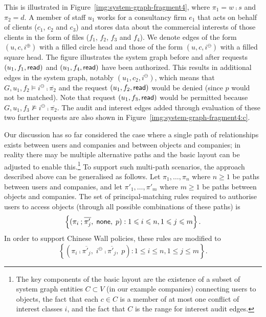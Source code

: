 \documentclass{article}
\newcommand{\set}[1]{\ensuremath{\left\{#1\right\}}} \newcommand{\setO}[1]{\ensuremath{\left\{#1\right.}} \newcommand{\setC}[1]{\ensuremath{\left.#1\right\}}} \newcommand{\setN}[1]{\ensuremath{\left.#1\right.}} \newcommand{\sett}[1]{\ensuremath{\left\{\textit{#1}\right\}}} \newcommand{\tuple}[1]{\ensuremath{\left(#1\right)}} \newcommand{\tuplet}[1]{\ensuremath{\left(\textit{#1}\right)}} \newcommand{\card}[1]{\left| #1 \right|}
\newcommand{\interesta}{\ensuremath{i^\oplus}}
\newcommand{\interestb}{\ensuremath{i^\ominus}}
\begin{document}
This is illustrated in Figure~\ref{img:system-graph-fragment4}, where $\pi_1 = w \comp s$ and $\pi_2 = d$.
A member of staff $u_1$ works for a consultancy firm $e_1$ that acts on behalf of clients ($c_1$, $c_2$ and $c_3$) and stores data about the commercial interests of those clients in the form of files ($f_1$, $f_2$, $f_3$ and $f_4$).
We denote edges of the form $(u,c,\interesta)$ with a filled circle head and those of the form $(u,c,\interestb)$ with a filled square head.
The figure illustrates the system graph before and after requests $(u_1,f_1,\textsf{read})$ and $(u_1,f_4,\textsf{read})$ have been authorized.
This results in additional edges in the system graph, notably $(u_1,c_2,\interestb)$, which means that $G,u_1,f_2 \models \interestb \comp \overline{\pi_2}$ and the request $(u_1,f_2,\textsf{read})$ would be denied (since $p$ would not be matched).
Note that request $(u_1,f_3,\textsf{read})$ would be permitted because $G,u_1,f_3 \not\models \interestb \comp \overline{\pi_2}$.
The audit and interest edges added through evaluation of these two further requests are also shown in Figure~\ref{img:system-graph-fragment4:c}.

Our discussion has so far considered the case where a single path of relationships exists between users and companies and between objects and companies; in reality there may be multiple alternative paths and the basic layout can be adjusted to enable this.\footnote{The key components of the basic layout are the existence of a subset of system graph entities $C \subset V$ (in our example companies) connecting users to objects, the fact that each $c \in C$ is a member of at most one conflict of interest classes $i$, and the fact that $C$ is the range for interest audit edges.}
To support such multi-path scenarios, the approach described above can be generalised as follows.
Let $\pi_1, \dots, \pi_n$ where $n \geqslant 1$ be paths between users and companies, and let $\pi'_1, \dots, \pi'_m$ where $m \geqslant 1$ be paths between objects and companies.
The set of principal-matching rules required to authorise users to access objects (through all possible combinations of these paths) is \[
    \set{(\pi_i \comp \overline{\pi'_j},\; \none,\; p) : 1 \leqslant i \leqslant n, 1 \leqslant j \leqslant m}.
\]
In order to support Chinese Wall policies, these rules are modified to
\[
    \set{(\pi_i \comp \overline{\pi'_j},\; \interestb \comp \overline{\pi'_j},\; p) : 1 \leqslant i \leqslant n, 1 \leqslant j \leqslant m}.
\]
\end{document}
